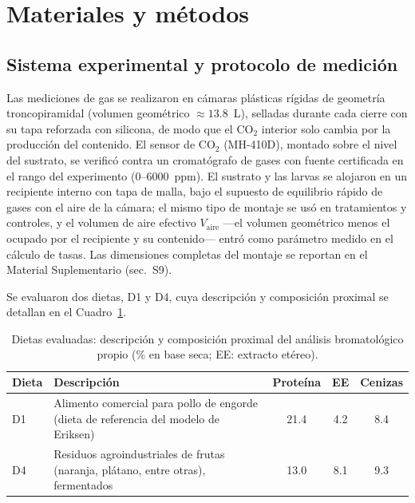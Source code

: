 \section{Materiales y métodos}
\label{sec:metodos}

\subsection{Sistema experimental y protocolo de medición}
\label{sec:sistema}

Las mediciones de gas se realizaron en cámaras plásticas rígidas de geometría troncopiramidal (volumen geométrico $\approx 13.8$~L), selladas durante cada cierre con su tapa reforzada con silicona, de modo que el CO$_2$ interior solo cambia por la producción del contenido. El sensor de CO$_2$ (MH-410D), montado sobre el nivel del sustrato, se verificó contra un cromatógrafo de gases con fuente certificada en el rango del experimento (0--6000~ppm). El sustrato y las larvas se alojaron en un recipiente interno con tapa de malla, bajo el supuesto de equilibrio rápido de gases con el aire de la cámara; el mismo tipo de montaje se usó en tratamientos y controles, y el volumen de aire efectivo $V_{\mathrm{aire}}$ ---el volumen geométrico menos el ocupado por el recipiente y su contenido--- entró como parámetro medido en el cálculo de tasas. Las dimensiones completas del montaje se reportan en el Material Suplementario (sec.~S9).

Se evaluaron dos dietas, D1 y D4, cuya descripción y composición proximal se
detallan en el Cuadro~\ref{tab:dietas}.

\begin{table}[htbp]
  \centering
  \caption{Dietas evaluadas: descripción y composición proximal del análisis
  bromatológico propio (\% en base seca; EE: extracto etéreo).}
  \label{tab:dietas}
  \begin{tabular}{lp{5.4cm}ccc}
    \hline
    Dieta & Descripción & Proteína & EE & Cenizas \\
    \hline
    D1 & Alimento comercial para pollo de engorde (dieta de referencia del
         modelo de Eriksen) & 21.4 & 4.2 & 8.4 \\
    D4 & Residuos agroindustriales de frutas (naranja, plátano, entre
         otras), fermentados & 13.0 & 8.1 & 9.3 \\
    \hline
  \end{tabular}
\end{table}


